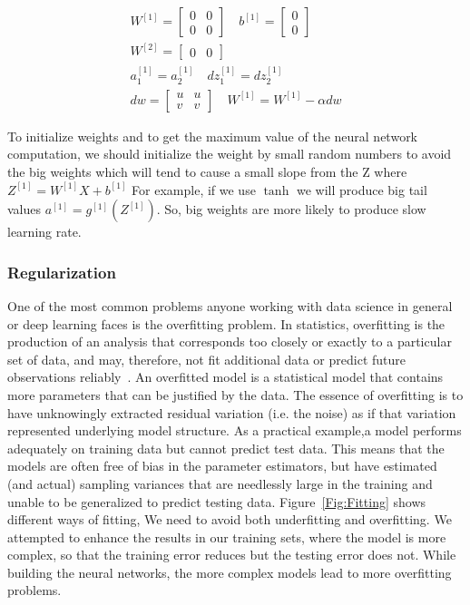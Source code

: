 \begin{subequations}\label{eq:nn_weights_init_zero}
\begin{align}
 W^{[1]} = \begin{bmatrix} 0 & 0\\ 0 & 0 \end{bmatrix} \quad b^{[1]} = \begin{bmatrix} 0 \\ 0 \end{bmatrix} \\
 W^{[2]} = \begin{bmatrix} 0 & 0 \end{bmatrix} \\
 a_1^{[1]} = a_2^{[1]} \quad   dz_1^{[1]} = dz_2^{[1]}\\
 dw = \begin{bmatrix} u & u \\ v & v \end{bmatrix} \quad W^{[1]} = W^{[1]} - \alpha dw
\end{align}
\end{subequations}%

To initialize weights and to get the maximum value of the neural network computation, we should initialize the weight by small random numbers to avoid the big weights which will tend to cause a small slope from the Z where $Z^{[1]}= W^{[1]} X + b^{[1]}$ For example, if we use $\tanh$ we will produce big tail values $a^{[1]}= g^{[1]}(Z^{[1]})$. So, big weights are more likely to produce slow learning rate. 

\subsubsection{Regularization}

One of the most common problems anyone working with data science in general or deep learning faces is the overfitting problem. In statistics, overfitting is the production of an analysis that corresponds too closely or exactly to a particular set of data, and may, therefore, not fit additional data or predict future observations reliably~\cite{Wiki_Overfitting}. An overfitted model is a statistical model that contains more parameters that can be justified by the data. The essence of overfitting is to have unknowingly extracted residual variation (i.e. the noise) as if that variation represented underlying model structure. As a practical example,a  model performs adequately on training data but cannot predict test data. This means that the models are often free of bias in the parameter estimators, but have estimated (and actual) sampling variances that are needlessly large in the training and unable to be generalized to predict testing data. Figure~\ref{Fig:Fitting} shows different ways of fitting, We need to avoid both underfitting and overfitting. We attempted to enhance the results in our training sets, where the model is more complex, so that the training error reduces but the testing error does not. While building the neural networks, the more complex models lead to more overfitting problems.

